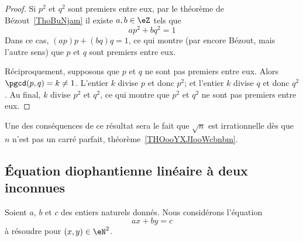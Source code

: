 \begin{proof}
    Si \( p^2\) et \( q^2\) sont premiers entre eux, par le théorème de Bézout~\ref{ThoBuNjam} il existe \( a,b\in \eZ\) tels que
    \begin{equation}
        ap^2+bq^2=1
    \end{equation}
    Dans ce cas, \( (ap)p+(bq)q=1\), ce qui montre (par encore Bézout, mais l'autre sens) que \( p\) et \( q\) sont premiers entre eux.

    Réciproquement, supposons que \( p\) et \( q\) ne sont pas premiers entre eux. Alors \( \pgcd(p,q)=k\neq 1\). L'entier \( k\) divise \( p\) et donc \( p^2\); et l'entier \( k\) divise \( q\) et donc \( q^2\). Au final, \( k\) divise \( p^2\) et \( q^2\), ce qui montre que \( p^2\) et \( q^2\) ne sont pas premiers entre eux.
\end{proof}

Une des conséquences de ce résultat sera le fait que \( \sqrt{n}\) est irrationnelle dès que \( n\) n'est pas un carré parfait, théorème~\ref{THOooYXJIooWcbnbm}.


\subsection{Équation diophantienne linéaire à deux inconnues}
\label{subsecZVKNooXNjPSf}



Soient \( a\), \( b\) et \( c\) des entiers naturels donnés. Nous considérons l'équation
\begin{equation}        \label{EqTOVSooJbxlIq}
    ax+by=c
\end{equation}
à résoudre\cite{PAYUooYVuNAB} pour \( (x,y)\in \eN^2\).

